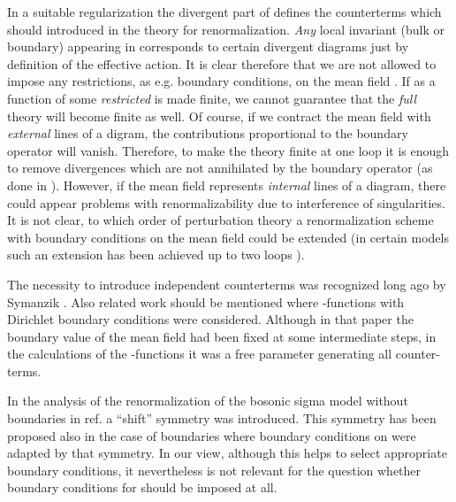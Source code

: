 \documentclass[a4paper,12pt]{article}
\begin{document}
In a suitable regularization the divergent part 
\coordHE{} of \coordHE{}
defines the counterterms which should introduced in the
theory for renormalization. {\it Any} local invariant
(bulk or boundary) appearing in \coordHE{}
corresponds to certain divergent diagrams just by definition
of the effective action. It is clear therefore that we
are not allowed to impose any restrictions, as e.g.
boundary conditions, on the mean field \coordHE{}. 
If  \coordHE{} as a function
of some {\it restricted} \coordHE{} is made finite, 
we cannot guarantee that
the {\it full} theory will become finite as well.
Of course, if we contract the mean field with {\it
external} lines of a digram, the contributions proportional
to the boundary operator will vanish. Therefore, to make the
theory finite at one loop it is enough to remove divergences
which are not annihilated by the boundary operator (as done
in \cite{Callan88}). However, if the mean field represents
{\it internal} lines of a diagram, there could appear problems
with renormalizability due to interference of singularities.
It is not clear, to which order of perturbation theory
a renormalization scheme with boundary conditions on the
mean field could be extended (in certain models such an extension 
has been achieved up to two loops \cite{McO2}). 

The necessity to introduce independent counterterms was recognized
long ago by Symanzik \cite{Symanzik}. Also  related 
work \cite{Wipf94} should be mentioned where \myHighlight{$\beta$}\coordHE{}-functions with
Dirichlet boundary conditions were considered. Although in that
paper the boundary value of the mean field had been fixed at
some intermediate steps, in the calculations of the \myHighlight{$\beta$}\coordHE{}-functions
it was a free parameter generating all counter-terms.


In the analysis 
of the renormalization
of the bosonic sigma model without boundaries 
in ref. \cite{Howe88} 
a ``shift'' symmetry \coordHE{}
was introduced. This symmetry has been proposed also
in the case of boundaries \cite{Osborn91} where
boundary conditions on \coordHE{} were adapted by that
symmetry. In our
view, although this helps to select appropriate
boundary conditions, it nevertheless is not
relevant for the question 
whether boundary conditions for \coordHE{} should be imposed at all.
\end{document}
